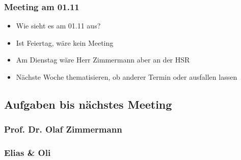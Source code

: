 \hypertarget{meeting-am-01.11}{%
\subsubsection*{Meeting am 01.11}\label{meeting-am-01.11}}

\begin{itemize}

\item
  Wie sieht es am 01.11 aus?
\item
  Ist Feiertag, wäre kein Meeting
\item
  Am Dienstag wäre Herr Zimmermann aber an der HSR
\item
  Nächste Woche thematisieren, ob anderer Termin oder ausfallen lassen
\end{itemize}

\hypertarget{aufgaben-bis-nachstes-meeting}{%
\subsection*{Aufgaben bis nächstes
Meeting}\label{aufgaben-bis-nachstes-meeting}}

\hypertarget{prof.-dr.-olaf-zimmermann}{%
\subsubsection*{Prof. Dr. Olaf
Zimmermann}\label{prof.-dr.-olaf-zimmermann}}

\hypertarget{elias-ux5cux26-oli}{%
\subsubsection*{Elias \& Oli}\label{elias-ux5cux26-oli}}